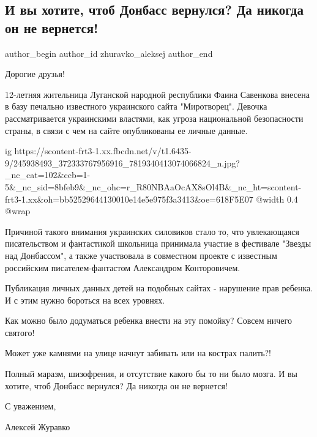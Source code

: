  
 
 
 
 
 
\subsection{И вы хотите, чтоб Донбасс вернулся? Да никогда он не вернется!}
\label{sec:15_10_2021.fb.zhuravko_aleksej.1.donbass_savenkova_mirotvorec}
 
\ifcmt
 author_begin
   author_id zhuravko_aleksej
 author_end
\fi

Дорогие друзья! 

12-летняя жительница Луганской народной республики Фаина Савенкова внесена в
базу печально известного украинского сайта "Миротворец". Девочка
рассматривается украинскими властями, как угроза национальной безопасности
страны, в связи с чем на сайте опубликованы ее личные данные.

\ifcmt
  ig https://scontent-frt3-1.xx.fbcdn.net/v/t1.6435-9/245938493_372333767956916_7819340413074066824_n.jpg?_nc_cat=102&ccb=1-5&_nc_sid=8bfeb9&_nc_ohc=r_R80NBAaOcAX8sOl4B&_nc_ht=scontent-frt3-1.xx&oh=bb52529644130010e14e5e975f3a3413&oe=618F5E07
  @width 0.4
  @wrap \parpic[r]
\fi

Причиной такого внимания украинских силовиков стало то, что увлекающаяся
писательством и фантастикой школьница принимала участие в фестивале "Звезды над
Донбассом", а также участвовала в совместном проекте с известным российским
писателем-фантастом Александром Конторовичем.

Публикация личных данных детей на подобных сайтах - нарушение прав ребенка. И с
этим нужно бороться на всех уровнях. 

Как можно было додуматься ребенка внести на эту помойку? Совсем ничего святого! 

Может уже камнями на улице начнут забивать или на кострах палить?! 

Полный маразм, шизофрения, и отсутствие какого бы то ни было мозга. И вы
хотите, чтоб Донбасс вернулся? Да никогда он не вернется!

С уважением, 

Алексей Журавко

